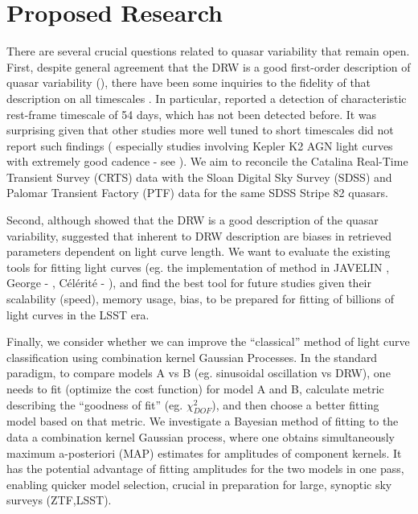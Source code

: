 \documentclass[modern]{aastex62}
\begin{document}
\section{Proposed Research}

There are several crucial questions related to quasar variability that remain open. First, despite general agreement that the DRW is a good first-order description of quasar variability (\cite{zu2011,kozlowski2010}), there have been some inquiries to the fidelity of that description on all timescales \cite{zu2013, kasliwal2017, sartori2018}. In particular, \cite{graham2014} reported  a detection of characteristic rest-frame timescale of 54 days, which has not been detected before. It was surprising given that other studies more well tuned to short timescales did not report such findings ( especially studies involving Kepler K2  AGN light curves with extremely good cadence - see \cite{kasliwal2015a, aranzana2018, smith2018}). We aim to reconcile the Catalina Real-Time Transient Survey (CRTS) data with the Sloan Digital Sky Survey (SDSS) and Palomar Transient Factory (PTF) data for the same SDSS Stripe 82 quasars. 

Second, although \cite{kelly2011} showed that the DRW is a good description of the quasar variability, \cite{kozlowski2017a} suggested that inherent to DRW description are biases in retrieved parameters dependent on light curve length. We want to evaluate the existing tools for fitting light curves (eg. the implementation of \cite{rybicki1995} method in JAVELIN \cite{zu2011}, George - \cite{ambikasaran2015}, C\'el\'erit\'e - \cite{foreman2017}), and find the best tool for future studies given their scalability (speed), memory usage, bias, to be prepared for fitting of billions of light curves in the LSST era. 

Finally, we consider whether we can improve the ``classical'' method of light curve classification using combination kernel Gaussian Processes. In the standard paradigm,  to compare models A vs B (eg. sinusoidal oscillation vs DRW), one needs to fit (optimize the cost function) for model A and B,  calculate metric describing the ``goodness of fit'' (eg. $\chi^{2}_{DOF}$), and then choose a better fitting model based on that metric. We investigate a Bayesian method of fitting to the data a combination kernel Gaussian process, where one obtains simultaneously maximum a-posteriori (MAP) estimates for amplitudes of component kernels. It has the potential advantage of fitting amplitudes for the two models in one pass, enabling quicker model selection, crucial in preparation for large, synoptic sky surveys (ZTF,LSST).
\end{document}
